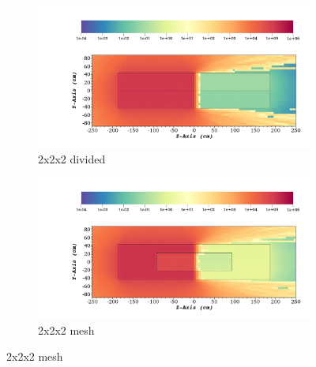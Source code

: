 \begin{figure}[H]
	\begin{subfigure}[t]{0.5\textwidth}
		\includegraphics[width=\linewidth, trim={8cm 2cm 2cm 10cm},clip]{../figs/toy_p2/dose_VPII_2x_split.png}
		\caption{2x2x2 divided}
		\label{fig:2dose_2x_split}
	\end{subfigure}\hfill
	\begin{subfigure}[t]{0.5\textwidth}
		\includegraphics[width=\linewidth, trim={8cm 2cm 2cm 10cm},clip]{../figs/toy_p2/dose_VPII_2x_mesh.png}
		\caption{2x2x2 mesh}
		\label{fig:2dose_2x_mesh}
	\end{subfigure}


\end{figure}
